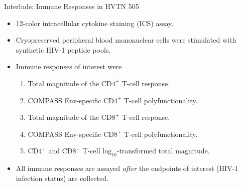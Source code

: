 \documentclass{beamer}
\begin{document}
\begin{frame}[c]{Interlude: Immune Responses in HVTN 505}
\begin{center}
\begin{itemize}
  \itemsep10pt
  \item 12-color intracellular cytokine staining (ICS) assay.
  \item Cryopreserved peripheral blood mononuclear cells were stimulated with
    synthetic HIV-1 peptide pools.
  \item Immune responses of interest were
    \begin{enumerate}
      \item Total magnitude of the $\text{CD4}^+$ T-cell response.
      \item COMPASS Env-specific $\text{CD4}^+$ T-cell polyfunctionality.
      \item Total magnitude of the $\text{CD8}^+$ T-cell response.
      \item COMPASS Env-specific $\text{CD8}^+$ T-cell polyfunctionality.
      \item $\text{CD4}^+$ and $\text{CD8}^+$ T-cell
        $\text{log}_{10}$-transformed total magnitude.
    \end{enumerate}
  \item All immune responses are assayed \textit{after} the endpoints of
    interest (HIV-1 infection status) are collected.
\end{itemize}
\end{center}

\end{frame}

\end{document}
